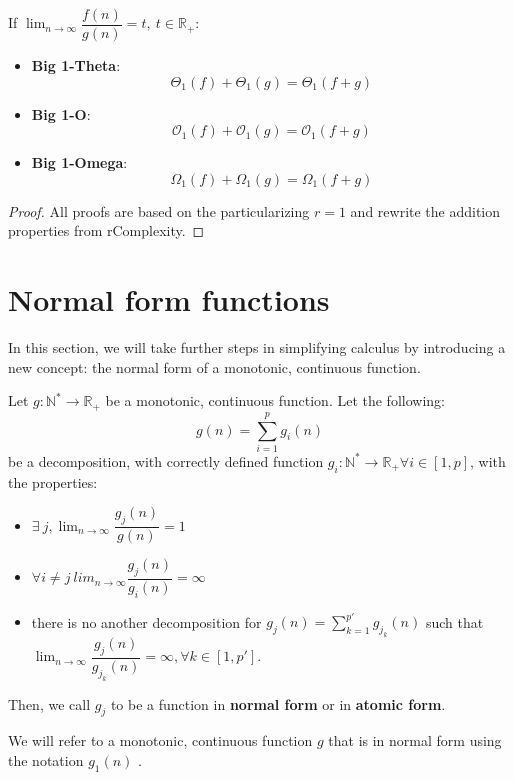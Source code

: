 \begin{lemma}
    If $\lim_{n\to\infty} \dfrac{f(n)}{g(n)} = t, \ t \in \mathbb{R}_{+}$:
    \begin{itemize}
        \item \textbf{Big 1-Theta}:
        \[  \Theta_{1}(f) + \Theta_{1}(g) = \Theta_{1}(f + g)\]
        \item \textbf{Big 1-O}:
        \[  \mathcal{O}_{1}(f) + \mathcal{O}_{1}(g) = \mathcal{O}_{1}(f + g)\]
        \item \textbf{Big 1-Omega}:
        \[  \Omega_{1}(f) + \Omega_{1}(g) = \Omega_{1}(f + g)\]
    \end{itemize}
\end{lemma}

\begin{proof}
    All proofs are based on the particularizing $r=1$ and rewrite the addition properties from rComplexity.
\end{proof}


\section{Normal form functions}
In this section, we will take further steps in simplifying calculus by introducing a new concept: the normal form of a monotonic, continuous function.
\begin{definition}
    Let $g:\mathbb{N}^{*}\longrightarrow\mathbb{R}_{+} $ be a monotonic, continuous function. Let the following:
    \[ g(n) = \sum_{i=1}^{p} g_{i}(n)\]
    be a decomposition, with correctly defined function $g_{i}:\mathbb{N}^{*}\longrightarrow\mathbb{R}_{+} \forall i \in [1, p]$, with the properties:
    \begin{itemize}

        \item $ \exists \ j, \lim_{n\to\infty} \dfrac{g_{j}(n)}{g(n)} = 1$
        \item $\forall i \neq j \  lim_{n\to\infty} \dfrac{g_{j}(n)}{g_{i}(n)} = \infty$
        \item there is no another decomposition for $g_{j}(n) = \sum_{k=1}^{p'} g_{j_{k}}(n)$ such that $\lim_{n\to\infty} \dfrac{g_{j}(n)}{g_{j_{k}}(n)} = \infty, \forall k \in [1, p']$.
    \end{itemize}
    Then, we call $g_{j}$ to be a function in \textbf{normal form} or in \textbf{atomic form}.
\end{definition}

\begin{remark}
    We will refer to a monotonic, continuous function $g$ that is in normal form using the notation $g_{1}(n)$ .
\end{remark}


